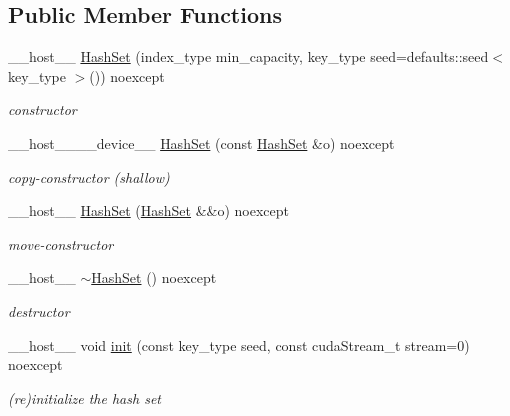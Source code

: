 \subsection*{Public Member Functions}
\begin{DoxyCompactItemize}
\item 
\+\_\+\+\_\+host\+\_\+\+\_\+ \hyperlink{classwarpcore_1_1HashSet_aff2bcd0720090d1dcfc03d0e7d9a1eab}{Hash\+Set} (index\+\_\+type min\+\_\+capacity, key\+\_\+type seed=defaults\+::seed$<$ key\+\_\+type $>$()) noexcept
\begin{DoxyCompactList}\small\item\em constructor \end{DoxyCompactList}\item 
\+\_\+\+\_\+host\+\_\+\+\_\+\+\_\+\+\_\+device\+\_\+\+\_\+ \hyperlink{classwarpcore_1_1HashSet_a4f3bde62cd45155bbc7eb5db38357f28}{Hash\+Set} (const \hyperlink{classwarpcore_1_1HashSet}{Hash\+Set} \&o) noexcept
\begin{DoxyCompactList}\small\item\em copy-\/constructor (shallow) \end{DoxyCompactList}\item 
\+\_\+\+\_\+host\+\_\+\+\_\+ \hyperlink{classwarpcore_1_1HashSet_a572b36003a5652fa6a28155b9a5b6e1d}{Hash\+Set} (\hyperlink{classwarpcore_1_1HashSet}{Hash\+Set} \&\&o) noexcept
\begin{DoxyCompactList}\small\item\em move-\/constructor \end{DoxyCompactList}\item 
\mbox{\label{classwarpcore_1_1HashSet_a5419d12a6675f108bcda8a03580ee67c}} 
\+\_\+\+\_\+host\+\_\+\+\_\+ \hyperlink{classwarpcore_1_1HashSet_a5419d12a6675f108bcda8a03580ee67c}{$\sim$\+Hash\+Set} () noexcept
\begin{DoxyCompactList}\small\item\em destructor \end{DoxyCompactList}\item 
\+\_\+\+\_\+host\+\_\+\+\_\+ void \hyperlink{classwarpcore_1_1HashSet_a6654bf5c2c17b0676d6fd4867fa991cd}{init} (const key\+\_\+type seed, const cuda\+Stream\+\_\+t stream=0) noexcept
\begin{DoxyCompactList}\small\item\em (re)initialize the hash set \end{DoxyCompactList}\item 

\end{DoxyCompactItemize}
